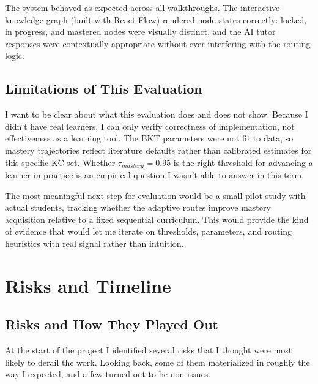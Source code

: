 \documentclass{article}
\begin{document}
The system behaved as expected across all walkthroughs. The interactive knowledge graph (built with React Flow) rendered node states correctly: locked, in progress, and mastered nodes were visually distinct, and the AI tutor responses were contextually appropriate without ever interfering with the routing logic.

\subsection{Limitations of This Evaluation}

I want to be clear about what this evaluation does and does not show. Because I didn't have real learners, I can only verify correctness of implementation, not effectiveness as a learning tool. The BKT parameters were not fit to data, so mastery trajectories reflect literature defaults rather than calibrated estimates for this specific KC set. Whether $\tau_{mastery} = 0.95$ is the right threshold for advancing a learner in practice is an empirical question I wasn't able to answer in this term.

The most meaningful next step for evaluation would be a small pilot study with actual students, tracking whether the adaptive routes improve mastery acquisition relative to a fixed sequential curriculum. This would provide the kind of evidence that would let me iterate on thresholds, parameters, and routing heuristics with real signal rather than intuition.

\FloatBarrier


\section{Risks and Timeline}

\subsection{Risks and How They Played Out}

At the start of the project I identified several risks that I thought were most likely to derail the work. Looking back, some of them materialized in roughly the way I expected, and a few turned out to be non-issues.
\end{document}
